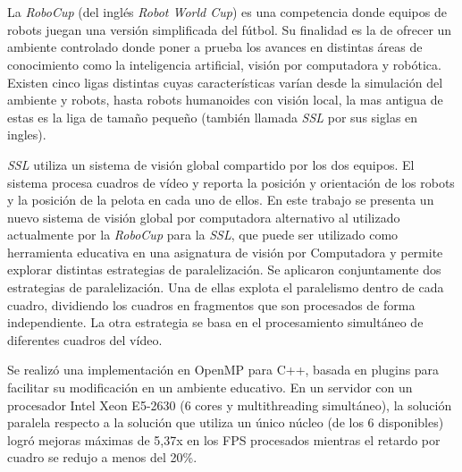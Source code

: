 \ \\
\ \\
\label{pagresum}
\\
\ \\
\ \\

\ \\

\ \\

La \emph{RoboCup} (del inglés \emph{Robot World Cup}) es una competencia donde
equipos de robots juegan una versión simplificada del fútbol. Su finalidad es
la de ofrecer un ambiente controlado donde poner a prueba los avances en
distintas áreas de conocimiento como la inteligencia artificial, visión por
computadora y robótica. Existen cinco ligas distintas cuyas características
varían desde la simulación del ambiente y robots, hasta robots humanoides con
visión local, la mas antigua de estas es la liga de tamaño pequeño (también
llamada \emph{SSL} por sus siglas en ingles).

\emph{SSL} utiliza un sistema de visión global compartido por los dos equipos.
El sistema procesa cuadros de vídeo y reporta la posición y orientación de los
robots y la posición de la pelota en cada uno de ellos. En este trabajo se
presenta un nuevo sistema de visión global por computadora alternativo al
utilizado actualmente por la \emph{RoboCup} para la \emph{SSL}, que puede ser
utilizado como herramienta educativa en una asignatura de visión por
Computadora y permite explorar distintas estrategias de paralelización. Se
aplicaron conjuntamente dos estrategias de paralelización. Una de ellas
explota el paralelismo dentro de cada cuadro, dividiendo los cuadros en
fragmentos que son procesados de forma independiente. La otra estrategia se
basa en el procesamiento simultáneo de diferentes cuadros del vídeo.

Se realizó una implementación en OpenMP para C++, basada en plugins para
facilitar su modificación en un ambiente educativo. En un servidor con un
procesador Intel Xeon E5-2630 (6 cores y multithreading simultáneo), la
solución paralela respecto a la solución que utiliza un único núcleo (de los 6
disponibles) logró mejoras máximas de 5,37x en los FPS procesados mientras el
retardo por cuadro se redujo a menos del 20\%.

\vfill
\pagebreak
